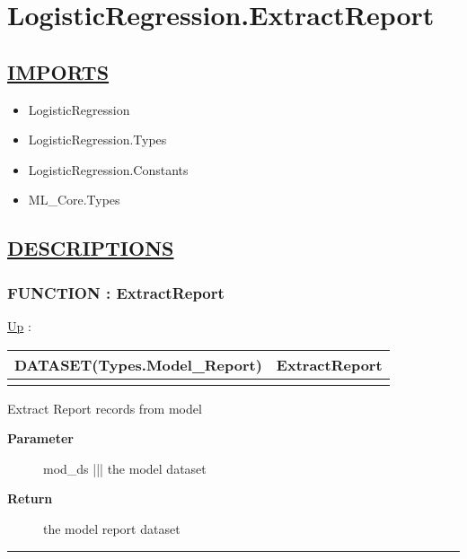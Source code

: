 \chapter*{LogisticRegression.ExtractReport}
\hypertarget{ecldoc:toc:LogisticRegression.ExtractReport}{}

\section*{\underline{IMPORTS}}
\begin{itemize}
\item LogisticRegression
\item LogisticRegression.Types
\item LogisticRegression.Constants
\item ML\_Core.Types
\end{itemize}

\section*{\underline{DESCRIPTIONS}}
\subsection*{FUNCTION : ExtractReport}
\hypertarget{ecldoc:logisticregression.extractreport}{}
\hyperlink{ecldoc:toc:LogisticRegression}{Up} :

{\renewcommand{\arraystretch}{1.5}
\begin{tabularx}{\textwidth}{|>{\raggedright\arraybackslash}l|X|}
\hline
\hspace{0pt}DATASET(Types.Model\_Report) & ExtractReport \\
\hline
\multicolumn{2}{|>{\raggedright\arraybackslash}X|}{\hspace{0pt}(DATASET(Core\_Types.Layout\_Model) mod\_ds)} \\
\hline
\end{tabularx}
}

\par
Extract Report records from model

\par
\begin{description}
\item [\textbf{Parameter}] mod\_ds ||| the model dataset
\item [\textbf{Return}] the model report dataset
\end{description}

\rule{\linewidth}{0.5pt}

